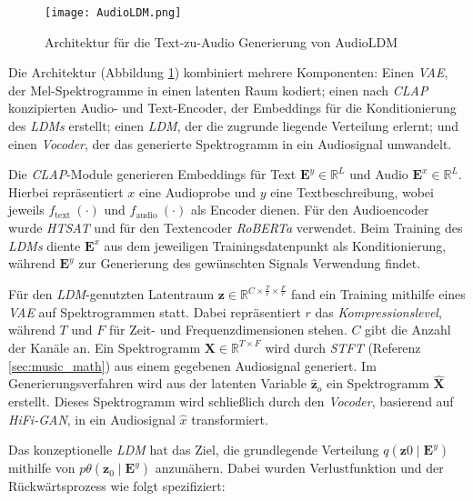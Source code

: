 \documentclass[
  a4paper,  %
  twoside,  %
  bibliography=totoc,
  headsepline,
  cleardoublepage=empty,
  parskip=half,
  draft=false
]{scrbook}
\begin{document}
\begin{figure}[h]
  \centering
  \texttt{[image: AudioLDM.png]}
  \caption[AudioLDM Architektur]{Architektur für die Text-zu-Audio Generierung von AudioLDM\cite{liu_audioldm_2023}}
  \label{fig:AudioLDM}
\end{figure} 

Die Architektur (Abbildung \ref{fig:AudioLDM}) kombiniert mehrere Komponenten: Einen \emph{VAE}\cite{kingma_auto-encoding_2022}, der Mel-Spektrogramme in einen latenten Raum kodiert; einen nach \emph{CLAP}\cite{wu_large-scale_2023} konzipierten Audio- und Text-Encoder, der Embeddings für die Konditionierung des \emph{LDMs} erstellt; einen \emph{LDM}, der die zugrunde liegende Verteilung erlernt; und einen \emph{Vocoder}, der das generierte Spektrogramm in ein Audiosignal umwandelt. \cite{liu_audioldm_2023}

Die \emph{CLAP}-Module generieren Embeddings für Text $\boldsymbol{E}^y \in \mathbb{R}^L$ und Audio $\boldsymbol{E}^x \in \mathbb{R}^L$. Hierbei repräsentiert $x$ eine Audioprobe und $y$ eine Textbeschreibung, wobei jeweils $f_{\text {text }}(\cdot)$ und $f_{\text {audio }}(\cdot)$ als Encoder dienen. Für den Audioencoder wurde \emph{HTSAT}\cite{chen_hts-at_2022} und für den Textencoder \emph{RoBERTa}\cite{liu_roberta_2019} verwendet. Beim Training des \emph{LDMs} diente $\boldsymbol{E}^x$ aus dem jeweiligen Trainingsdatenpunkt als Konditionierung, während $\boldsymbol{E}^y$ zur Generierung des gewünschten Signals Verwendung findet. \cite{liu_audioldm_2023}

Für den \emph{LDM}-genutzten Latentraum $\boldsymbol{z} \in \mathbb{R}^{C \times \frac{T}{r} \times \frac{F}{r}}$ fand ein Training mithilfe eines \emph{VAE} auf Spektrogrammen statt. Dabei repräsentiert $r$ das \emph{Kompressionslevel}, während $T$ und $F$ für Zeit- und Frequenzdimensionen stehen. $C$ gibt die Anzahl der Kanäle an. Ein Spektrogramm $\boldsymbol{X} \in \mathbb{R}^{T \times F}$ wird durch \emph{STFT} (Referenz \ref{sec:music_math}) aus einem gegebenen Audiosignal generiert. Im Generierungsverfahren wird aus der latenten Variable $\hat{\boldsymbol{z}}_o$ ein Spektrogramm $\hat{\boldsymbol{X}}$ erstellt. Dieses Spektrogramm wird schließlich durch den \emph{Vocoder}, basierend auf \emph{HiFi-GAN}\cite{kong_hifi-gan_2020}, in ein Audiosignal $\hat{x}$ transformiert. \cite{liu_audioldm_2023}

Das konzeptionelle \emph{LDM} hat das Ziel, die grundlegende Verteilung $q\left(\boldsymbol{z}0 \mid \boldsymbol{E}^y\right)$ mithilfe von $p\theta\left(\boldsymbol{z}_0 \mid \boldsymbol{E}^y\right)$ anzunähern. Dabei wurden Verlustfunktion und der Rückwärtsprozess wie folgt spezifiziert: \cite{liu_audioldm_2023}
\end{document}

